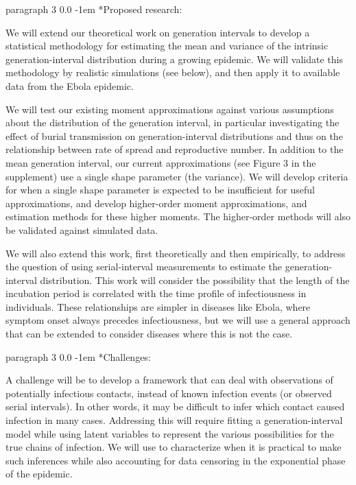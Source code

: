 \documentclass[12pt]{article}
\makeatletter
\renewcommand{\paragraph}{\vspace{0.40ex \@plus 0.2ex \@minus 0.0ex}\@startsection%
{paragraph}%
{3}%
{\parindent}%
{0.0\baselineskip}%
{-1em}%
{\normalfont\normalsize\bfseries}}%
\makeatother
\begin{document}
\paragraph*{Proposed research:}

We will extend our theoretical work on generation intervals to develop a statistical methodology for estimating the mean and variance of the intrinsic generation-interval distribution during a growing epidemic. We will validate this methodology by realistic simulations (see below), and then apply  it to available data from the Ebola epidemic.

We will test our existing moment approximations against various assumptions about the distribution of the generation interval, in particular investigating the effect of burial transmission on generation-interval distributions and thus on the relationship between rate of spread and reproductive number. In addition to the mean generation interval, our current approximations (see Figure 3 in the supplement) use a single shape parameter (the variance).  We will develop criteria for when a single shape parameter is expected to be insufficient for useful approximations, and develop higher-order moment approximations, and estimation methods for these higher moments. The higher-order methods will also be validated against simulated data.

We will also extend this work, first theoretically and then empirically, to address the question of using serial-interval measurements to estimate the generation-interval distribution. This work will consider the possibility that the length of the incubation period is correlated with the time profile of infectiousness in individuals. These relationships are simpler in diseases like Ebola, where symptom onset always precedes infectiousness, but we will use a general approach that can be extended to consider diseases where this is not the case.

\paragraph*{Challenges:}

A challenge will be to develop a framework that can deal with observations of potentially infectious contacts, instead of known infection events (or observed serial intervals). In other words, it may be difficult to infer which contact caused infection in many cases. Addressing this will require fitting a generation-interval model while using latent variables to represent the various possibilities for the true chains of infection. We will use to characterize when it is practical to make such inferences while also accounting for data censoring in the exponential phase of the epidemic.
\end{document}
